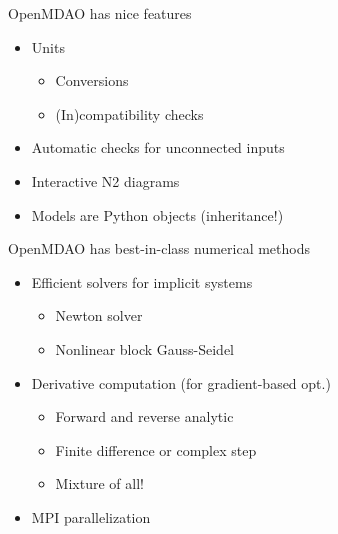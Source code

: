 \documentclass[aspectratio=169, usenames,dvipsnames, 14pt]{beamer}
\begin{document}
\begin{frame}{OpenMDAO has nice features}
    \begin{itemize}
        \item Units
          \begin{itemize}
              \item Conversions
              \item (In)compatibility checks
          \end{itemize}
\pause
\vspace{.5cm}
        \item Automatic checks for unconnected inputs
\pause
\vspace{.5cm}
        \item Interactive N2 diagrams
\pause
\vspace{.5cm}
        \item Models are Python objects (inheritance!)
    \end{itemize}
\end{frame}

\begin{frame}{OpenMDAO has best-in-class numerical methods}
    \begin{itemize}
        \item Efficient solvers for implicit systems
        \begin{itemize}
            \item Newton solver
            \item Nonlinear block Gauss-Seidel
        \end{itemize}
\pause
\vspace{0.5cm}
        \item Derivative computation (for gradient-based opt.)
        \begin{itemize}
            \item Forward and reverse analytic
            \item Finite difference or complex step
            \item Mixture of all!
            \end{itemize}
\pause
\vspace{0.5cm}
        \item MPI parallelization
    \end{itemize}
    
\end{frame}
\end{document}
